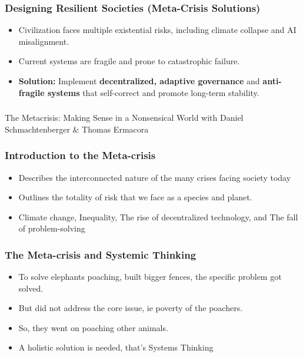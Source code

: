 \begin{frame}[fragile]\frametitle{Designing Resilient Societies (Meta-Crisis Solutions)}
	\begin{itemize}
	\item Civilization faces multiple existential risks, including climate collapse and AI misalignment.
	\item Current systems are fragile and prone to catastrophic failure.
	\item \textbf{Solution:} Implement \textbf{decentralized, adaptive governance} and \textbf{anti-fragile systems} that self-correct and promote long-term stability.
	\end{itemize}
\end{frame}

\begin{frame}[fragile]\frametitle{}
\begin{center}
{\Large The Metacrisis: Making Sense in a Nonsensical World with Daniel Schmachtenberger \& Thomas Ermacora}

\end{center}
\end{frame}


\begin{frame}[fragile]\frametitle{Introduction to the Meta-crisis}
	\begin{itemize}
	\item Describes the interconnected nature of the many crises facing society today
	\item Outlines the totality of risk that we face as a species and planet. 
	\item Climate change, Inequality, The rise of decentralized technology, and The fall of problem-solving
	\end{itemize}
\end{frame}

\begin{frame}[fragile]\frametitle{The Meta-crisis and Systemic Thinking}
	\begin{itemize}
	\item To solve elephants poaching, built bigger fences, the specific problem got solved.
	\item But did not address the core issue, ie poverty of the poachers.
	\item So, they went on poaching other animals.
	\item A holistic solution is needed, that's Systems Thinking
	\end{itemize}
\end{frame}

